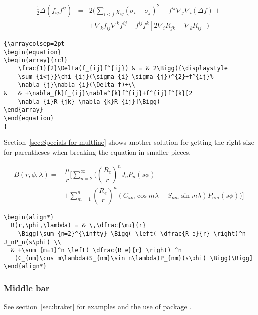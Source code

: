 {\arraycolsep=2pt
\begin{equation}
\begin{array}{rcl}
	\frac{1}{2}\Delta(f_{ij}f^{ij}) & = & 2\Bigg({\displaystyle
	\sum_{i<j}}\chi_{ij}(\sigma_{i}-\sigma_{j})^{2}+f^{ij}%
	\nabla_{j}\nabla_{i}(\Delta f)+\\
&	& +\nabla_{k}f_{ij}\nabla^{k}f^{ij}+f^{ij}f^{k}[2
	\nabla_{i}R_{jk}-\nabla_{k}R_{ij}]\Bigg)
\end{array}
\end{equation}
}
\begin{lstlisting}
{\arraycolsep=2pt
\begin{equation}
\begin{array}{rcl}
	\frac{1}{2}\Delta(f_{ij}f^{ij}) & = & 2\Bigg({\displaystyle
	\sum_{i<j}}\chi_{ij}(\sigma_{i}-\sigma_{j})^{2}+f^{ij}%
	\nabla_{j}\nabla_{i}(\Delta f)+\\
&	& +\nabla_{k}f_{ij}\nabla^{k}f^{ij}+f^{ij}f^{k}[2
	\nabla_{i}R_{jk}-\nabla_{k}R_{ij}]\Bigg)
\end{array}
\end{equation}
}
\end{lstlisting}

Section~\vref{sec:Specials-for-multline} shows another solution
for getting the right size for parentheses when breaking the equation
in smaller pieces.

\begin{align*}
  B(r,\phi,\lambda) = & \,\dfrac{\mu}{r} 
    \Bigg[\sum_{n=2}^{\infty} \Bigg( \left( \dfrac{R_e}{r} \right)^n J_nP_n(s\phi) \\
  & +\sum_{m=1}^n \left( \dfrac{R_e}{r} \right) ^n
   (C_{nm}\cos m\lambda+S_{nm}\sin m\lambda)P_{nm}(s\phi) \Bigg)\Bigg]
\end{align*}

\begin{lstlisting}
\begin{align*}
  B(r,\phi,\lambda) = & \,\dfrac{\mu}{r} 
    \Bigg[\sum_{n=2}^{\infty} \Bigg( \left( \dfrac{R_e}{r} \right)^n J_nP_n(s\phi) \\
  & +\sum_{m=1}^n \left( \dfrac{R_e}{r} \right) ^n
   (C_{nm}\cos m\lambda+S_{nm}\sin m\lambda)P_{nm}(s\phi) \Bigg)\Bigg]
\end{align*}
\end{lstlisting}


\subsubsection{Middle bar}
See section~\vref{sec:braket} for examples and the use of package .

